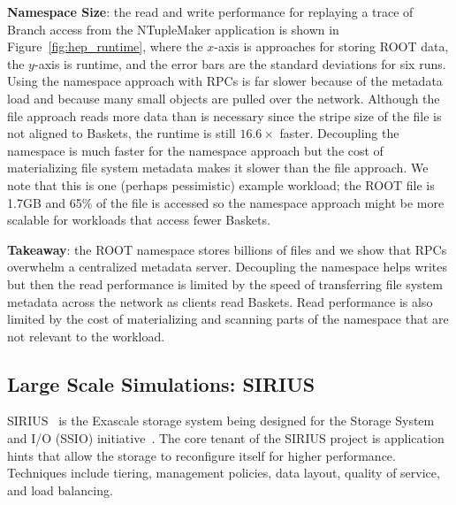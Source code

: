 \textbf{Namespace Size}: the read and write performance for replaying a trace
of Branch access from the NTupleMaker application is shown in
Figure~\ref{fig:hep_runtime}, where the \(x\)-axis is approaches for storing
ROOT data, the \(y\)-axis is runtime, and the error bars are the standard
deviations for six runs.  Using the namespace approach with RPCs is far slower
because of the metadata load and because many small objects are pulled over the
network.  Although the file approach reads more data than is necessary since
the stripe size of the file is not aligned to Baskets, the runtime is still
\(16.6\times\) faster. Decoupling the namespace is much faster for the
namespace approach but the cost of materializing file system metadata makes it
slower than the file approach.  We note that this is one (perhaps pessimistic)
example workload; the ROOT file is 1.7GB and 65\% of the file is accessed so
the namespace approach might be more scalable for workloads that access fewer
Baskets.


\textbf{Takeaway}: the ROOT namespace stores billions of files and we show that
RPCs overwhelm a centralized metadata server. Decoupling the namespace helps
writes but then the read performance is limited by the speed of transferring
file system metadata across the network as clients read Baskets.  Read
performance is also limited by the cost of materializing and scanning parts of
the namespace that are not relevant to the workload.

\subsection{Large Scale Simulations: SIRIUS}

SIRIUS~\cite{klasky:journal16-sirius} is the Exascale storage system being
designed for the Storage System and I/O (SSIO)
initiative~\cite{ross:report14-ssio}. The core tenant of the SIRIUS project is
application hints that allow the storage to reconfigure itself for higher
performance. Techniques include tiering, management policies, data layout,
quality of service, and load balancing. 

